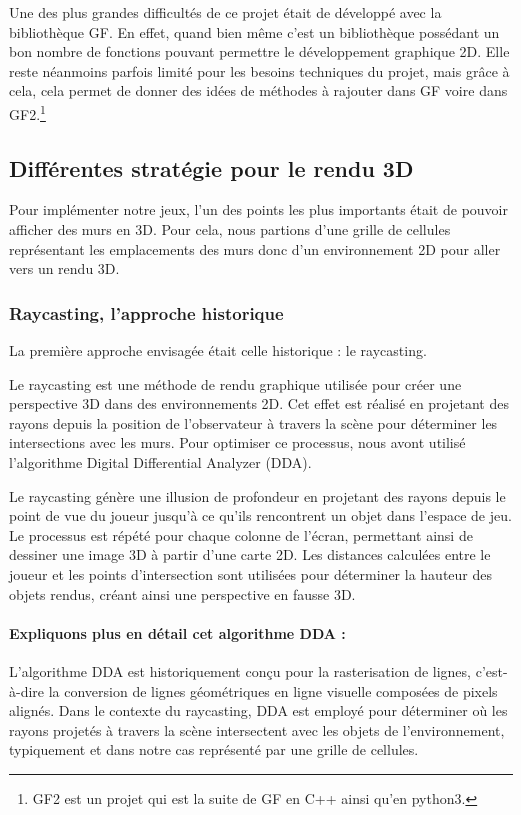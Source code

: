 \documentclass[12pt]{report}
\begin{document}
Une des plus grandes difficultés de ce projet était de développé avec la bibliothèque GF. En effet, quand bien même c'est un bibliothèque possédant un bon nombre de fonctions pouvant permettre le développement graphique 2D. Elle reste néanmoins parfois limité pour les besoins techniques du projet, mais grâce à cela, cela permet de donner des idées de méthodes à rajouter dans GF voire dans GF2.\footnote{GF2 est un projet qui est la suite de GF en C++ ainsi qu'en python3.}

\subsection{Différentes stratégie pour le rendu 3D}
Pour implémenter notre jeux, l'un des points les plus importants était de pouvoir afficher des murs en 3D. Pour cela, nous partions d'une grille de cellules 
représentant les emplacements des murs donc d'un environnement 2D pour aller vers un rendu 3D.
\subsubsection{Raycasting, l'approche historique}
La première approche envisagée était celle historique : le raycasting.

Le raycasting est une méthode de rendu graphique utilisée pour créer une perspective 3D dans des environnements 2D. Cet effet est réalisé en projetant des 
rayons depuis la position de l'observateur à travers la scène pour déterminer les intersections avec les murs. Pour optimiser ce
processus, nous avont utilisé l'algorithme Digital Differential Analyzer (DDA).

Le raycasting génère une illusion de profondeur en projetant des rayons depuis le point de vue du joueur jusqu'à ce qu'ils rencontrent un 
objet dans l'espace de jeu. Le processus est répété pour chaque colonne de l'écran, permettant ainsi de dessiner une image 3D à partir d'une
carte 2D. Les distances calculées entre le joueur et les points d'intersection sont utilisées pour déterminer la hauteur des objets rendus, 
créant ainsi une perspective en fausse 3D.

\paragraph{Expliquons plus en détail cet algorithme DDA :}
L'algorithme DDA est historiquement conçu pour la rasterisation de lignes, c'est-à-dire la conversion de lignes géométriques en ligne visuelle composées de pixels 
alignés. Dans le contexte du raycasting, DDA est employé pour déterminer où les rayons projetés à travers la scène intersectent avec les objets de l'environnement, 
typiquement et dans notre cas représenté par une grille de cellules.
\end{document}
